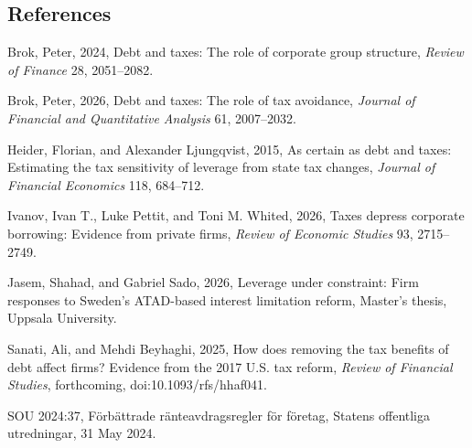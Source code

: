 \documentclass[12pt,a4paper]{article}
\newenvironment{refs}{\begin{list}{}{\setlength{\leftmargin}{1.5em}\setlength{\itemindent}{-1.5em}\setlength{\itemsep}{1pt}}}{\end{list}}
\begin{document}
\subsection*{References}
\begin{refs}
\item Brok, Peter, 2024, Debt and taxes: The role of corporate group structure, \emph{Review of Finance} 28, 2051--2082.
\item Brok, Peter, 2026, Debt and taxes: The role of tax avoidance, \emph{Journal of Financial and Quantitative Analysis} 61, 2007--2032.
\item Heider, Florian, and Alexander Ljungqvist, 2015, As certain as debt and taxes: Estimating the tax sensitivity of leverage from state tax changes, \emph{Journal of Financial Economics} 118, 684--712.
\item Ivanov, Ivan T., Luke Pettit, and Toni M. Whited, 2026, Taxes depress corporate borrowing: Evidence from private firms, \emph{Review of Economic Studies} 93, 2715--2749.
\item Jasem, Shahad, and Gabriel Sado, 2026, Leverage under constraint: Firm responses to Sweden's ATAD-based interest limitation reform, Master's thesis, Uppsala University.
\item Sanati, Ali, and Mehdi Beyhaghi, 2025, How does removing the tax benefits of debt affect firms? Evidence from the 2017 U.S. tax reform, \emph{Review of Financial Studies}, forthcoming, doi:10.1093/rfs/hhaf041.
\item SOU 2024:37, F\"orb\"attrade r\"anteavdragsregler f\"or f\"oretag, Statens offentliga utredningar, 31 May 2024.
\end{refs}
\end{document}

